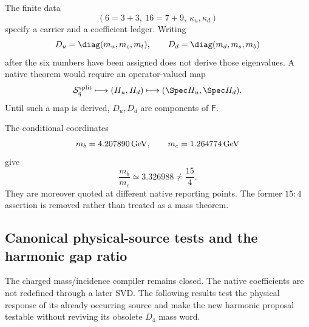\documentclass[12pt,a4paper]{article}
\begin{document}
\begin{proposition}
\label{p6:prop:split-packet-not-operator}
The finite data
\[
(6=3+3,\ 16=7+9,\ \kappa_u,\kappa_d)
\]
specify a carrier and a coefficient ledger.  Writing
\[
D_u=\diag(m_u,m_c,m_t),
\qquad
D_d=\diag(m_d,m_s,m_b)
\]
after the six numbers have been assigned does not derive those eigenvalues.
A native theorem would require an operator-valued map
\[
\mathcal S_q^{\rm split}
\longmapsto(H_u,H_d)
\longmapsto(\Spec H_u,\Spec H_d).
\]
Until such a map is derived, \(D_u,D_d\) are components of \(\mathsf F\).
\end{proposition}

\begin{corollary}
\label{p6:cor:withdraw-fifteen-four}
The conditional coordinates
\[
m_b=4.207890\,{\rm GeV},
\qquad
m_c=1.264774\,{\rm GeV}
\]
give
\[
\frac{m_b}{m_c}\simeq3.326988\ne\frac{15}{4}.
\]
They are moreover quoted at different native reporting points.  The former
\(15:4\) assertion is removed rather than treated as a mass theorem.
\end{corollary}

\subsection{Canonical physical-source tests and the harmonic gap ratio}
\label{p6:sec:v2210-lit-physical-source-test}
The charged mass/incidence compiler remains closed.  The native coefficients
are not redefined through a later SVD.  The following results test the
physical response of its already occurring source and make the new harmonic
proposal testable without reviving its obsolete \(D_4\) mass word.
\end{document}
